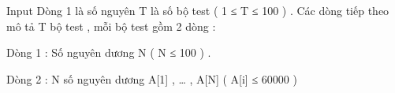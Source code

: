 Input
Dòng 1 là số nguyên T là số bộ test ( 1 ≤ T ≤ 100 ) . Các dòng tiếp theo mô tả T bộ test , mỗi bộ test gồm 2 dòng :


Dòng 1 : Số nguyên dương N ( N ≤ 100 ) .


Dòng 2 : N số nguyên dương A[1] , … , A[N] ( A[i] ≤ 60000 )
